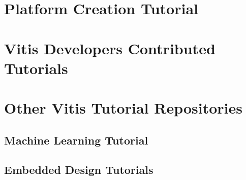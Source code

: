 \section{Platform Creation Tutorial}
\section{Vitis Developers Contributed Tutorials}
\section{Other Vitis Tutorial Repositories}

\subsection{Machine Learning Tutorial}
\subsection{Embedded Design Tutorials}
